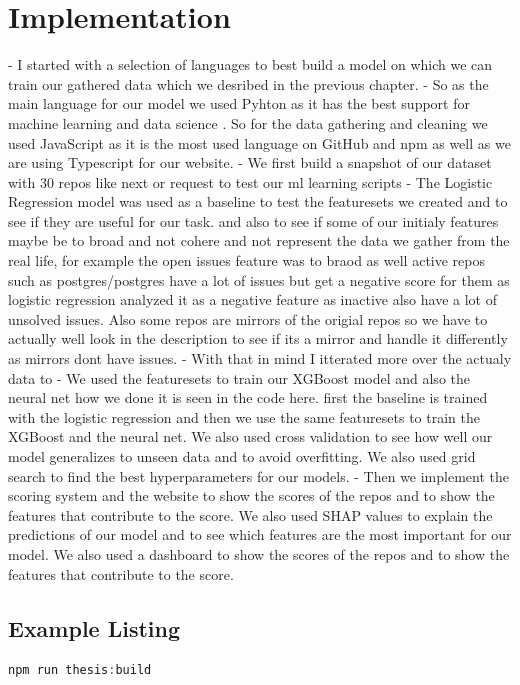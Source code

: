 \chapter{Implementation}
\label{chap:implementation}

- I started with a selection of languages to best build a model on which we can train our gathered data which we desribed in the previous chapter. 
- So as the main language for our model we used Pyhton as it has the best support for machine learning and data science \cite{gfg_python_ml} \cite{stackoverflow_python_2025}. So for the data gathering and cleaning we used JavaScript as it is the most used language on GitHub and npm \cite{github_language_stats} \cite{npm_language_stats} as well as we are using Typescript for our website.
- We first build a snapshot of our dataset with 30 repos like next or request to test our ml learning scripts
- The Logistic Regression model was used as a baseline to test the featuresets we created and to see if they are useful for our task. and also to see if some of our initialy features maybe be to broad and not cohere and not represent the data we gather from the real life, for example the open issues feature was to braod as well active repos such as postgres/postgres have a lot of issues but get a negative score for them as logistic regression analyzed it as a negative feature as inactive also have a lot of unsolved issues. Also some repos are mirrors of the origial repos so we have to actually well look in the description to see if its a mirror and handle it differently as mirrors dont have issues.
- With that in mind I itterated more over the actualy data to 
- We used the featuresets to train our XGBoost model and also the neural net how we done it is seen in the code here. first the baseline is trained with the logistic regression and then we use the same featuresets to train the XGBoost and the neural net. We also used cross validation to see how well our model generalizes to unseen data and to avoid overfitting. We also used grid search to find the best hyperparameters for our models.
- Then we implement the scoring system and the website to show the scores of the repos and to show the features that contribute to the score. We also used SHAP values to explain the predictions of our model and to see which features are the most important for our model. We also used a dashboard to show the scores of the repos and to show the features that contribute to the score.

\section{Example Listing}

\begin{lstlisting}[language=JavaScript,caption={Example npm command}]
npm run thesis:build
\end{lstlisting}
